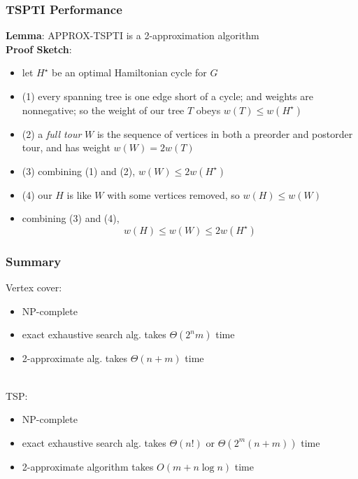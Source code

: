 \documentclass[10pt,aspectratio=169]{beamer}
\newcommand{\stanza}{ \\~\ }
\begin{document}
  \begin{frame} \frametitle{TSPTI Performance}
  \textbf{Lemma}: APPROX-TSPTI is a 2-approximation algorithm \\
  \textbf{Proof Sketch}:
  \begin{itemize}
    \item let $H^\star$ be an optimal Hamiltonian cycle for $G$
    \item (1) every spanning tree is one edge short of a cycle; and weights are nonnegative;
      so the weight of our tree $T$ obeys $w(T) \leq w(H^\star)$
    \item (2) a \emph{full tour} $W$ is the sequence of vertices in both a preorder and postorder
      tour, and has weight $w(W) = 2 w(T)$
    \item (3) combining (1) and (2), $w(W) \leq 2 w(H^\star)$
    \item (4) our $H$ is like $W$ with some vertices removed, so $w(H) \leq w(W)$
    \item combining (3) and (4),
      \[ w(H) \leq w(W) \leq 2 w(H^\star) \]
  \end{itemize}
  \end{frame}
  
  \begin{frame} \frametitle{Summary}
  Vertex cover:
  \begin{itemize}
    \item NP-complete
    \item exact exhaustive search alg. takes $\Theta(2^n m)$ time
    \item 2-approximate alg. takes $\Theta(n+m)$ time \stanza
  \end{itemize}
  
  TSP:
  \begin{itemize}
    \item NP-complete
    \item exact exhaustive search alg. takes $\Theta(n!)$ or $\Theta(2^m(n+m))$ time
    \item 2-approximate algorithm takes $O(m + n \log n)$ time
  \end{itemize}
  \end{frame}
\end{document}
